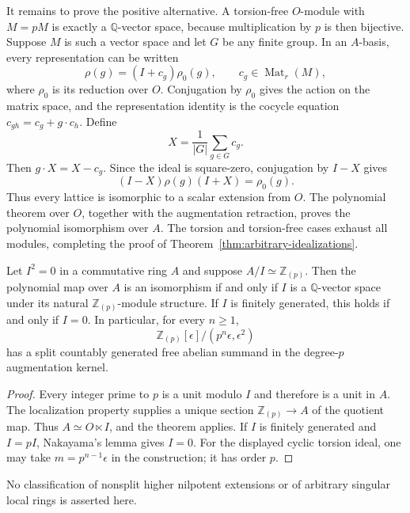 It remains to prove the positive alternative.  A torsion-free
$O$-module with $M=pM$ is exactly a $\mathbb Q$-vector space,
because multiplication by $p$ is then bijective.  Suppose $M$ is
such a vector space and let $G$ be any finite group.  In an
$A$-basis, every representation can be written
\[
 \rho(g)=(I+c_g)\rho_0(g),\qquad c_g\in\operatorname{Mat}_r(M),
\]
where $\rho_0$ is its reduction over $O$.  Conjugation by $\rho_0$
gives the action on the matrix space, and the representation
identity is the cocycle equation $c_{gh}=c_g+g\cdot c_h$.
Define
\[
 X=\frac1{|G|}\sum_{g\in G}c_g.
\]
Then $g\cdot X=X-c_g$.  Since the ideal is square-zero,
conjugation by $I-X$ gives
\[
 (I-X)\rho(g)(I+X)=\rho_0(g).
\]
Thus every lattice is isomorphic to a scalar extension from $O$.
The polynomial theorem over $O$, together with the augmentation
retraction, proves the polynomial isomorphism over $A$.
The torsion and torsion-free cases exhaust all modules, completing
the proof of Theorem~\ref{thm:arbitrary-idealizations}.

\begin{corollary}\label{cor:all-square-zero-extensions}
Let $I^2=0$ in a commutative ring $A$ and suppose $A/I\simeq
\mathbb Z_{(p)}$.  Then the polynomial map over $A$ is an
isomorphism if and only if $I$ is a $\mathbb Q$-vector space under
its natural $\mathbb Z_{(p)}$-module structure.
If $I$ is finitely generated, this holds if and only if $I=0$.
In particular, for every $n\ge1$,
\[
 \mathbb Z_{(p)}[\epsilon]/(p^n\epsilon,\epsilon^2)
\]
has a split countably generated free abelian summand in the
degree-$p$ augmentation kernel.
\end{corollary}

\begin{proof}
Every integer prime to $p$ is a unit modulo $I$ and therefore is
a unit in $A$.  The localization property supplies a unique
section $\mathbb Z_{(p)}\to A$ of the quotient map.  Thus
$A\simeq O\ltimes I$, and the theorem applies.  If $I$ is finitely
generated and $I=pI$, Nakayama's lemma gives $I=0$.
For the displayed cyclic torsion ideal, one may take
$m=p^{n-1}\epsilon$ in the construction; it has order $p$.
\end{proof}

No classification of nonsplit higher nilpotent extensions or of
arbitrary singular local rings is asserted here.
